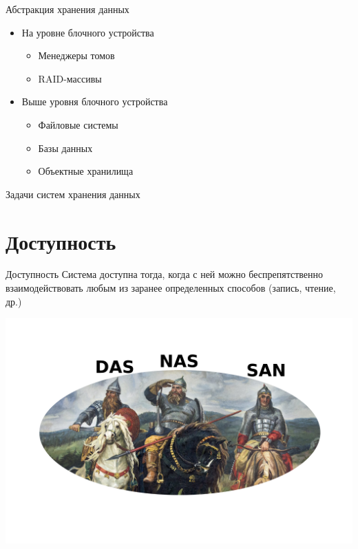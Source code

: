 \documentclass[aspectratio=169]{beamer}
\begin{document}
\begin{frame}{Абстракция хранения данных}
\begin{itemize}
    \item На уровне блочного устройства
    \begin{itemize}
        \item Менеджеры томов
        \item RAID-массивы
    \end{itemize}
    \item Выше уровня блочного устройства
    \begin{itemize}
        \item Файловые системы
        \item Базы данных
        \item Объектные хранилища
    \end{itemize}
\end{itemize}
\end{frame}

\begin{frame}{Задачи систем хранения данных}
    \organization
\end{frame}

\section{Доступность}

\begin{frame}{Доступность}
    \vspace{1em}
    Система доступна тогда, когда с ней можно беспрепятственно взаимодействовать любым из заранее определенных способов (запись, чтение, др.)

    \centering
    \includegraphics[scale=1.3]{fig/2.tri.png}
\end{frame}
\end{document}
